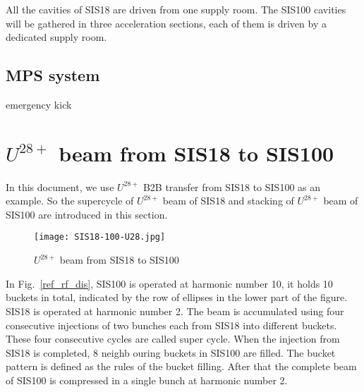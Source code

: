 All the cavities of SIS18 are driven from one supply room. The SIS100 cavities will be gathered in three acceleration sections, each of them is driven by a dedicated supply room. 

\subsection{\gls{MPS} system}
emergency kick

\section{$U^{28+}$ beam from SIS18 to SIS100}

In this document, we use $U^{28+}$ B2B transfer from SIS18 to SIS100 as an example. So the supercycle of $U^{28+}$ beam of SIS18 and stacking of $U^{28+}$ beam of SIS100 are introduced in this section. 
\begin{figure}[!htb]
   \centering   
   \texttt{[image: SIS18-100-U28.jpg]}
   \caption{$U^{28+}$ beam from SIS18 to SIS100}
   \label{SIS18-100-U28}
\end{figure}

In Fig.~\ref{ref_rf_dis}, SIS100 is operated at harmonic number 10, it holds 10 buckets in total, indicated by the row of ellipses in the lower part of the figure. SIS18 is operated at harmonic number 2. The beam is accumulated using four consecutive injections of two bunches each from SIS18 into different buckets. These four consecutive cycles are called super cycle. When the injection from SIS18 is completed, 8 neighb ouring buckets in SIS100 are filled. The bucket pattern is defined as the rules of the bucket filling. After that the complete beam of SIS100 is compressed in a single bunch at harmonic number 2.





